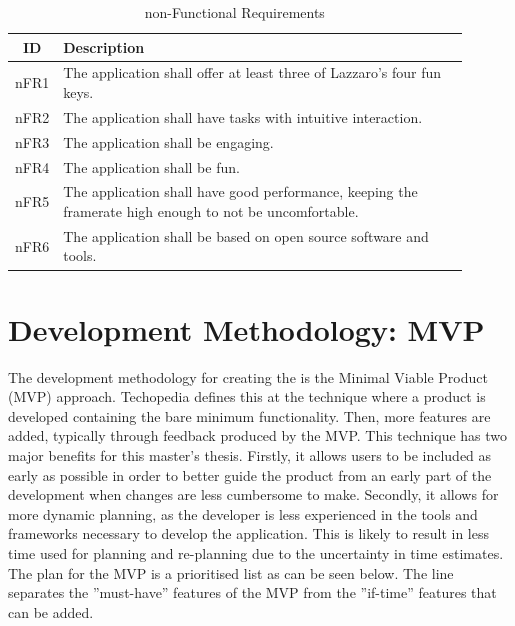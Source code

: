     \FloatBarrier
    \begin{table}
    \label{tab:nfr}
    \caption{non-Functional Requirements}
    \begin{tabular}{ | c | p{0.9\linewidth} | }
        \hline
        \textbf{ID} & \textbf{Description} \\
        \hline
        nFR1 & The application shall offer at least three of Lazzaro's four fun keys. \\
        nFR2 & The application shall have tasks with intuitive interaction. \\
        nFR3 & The application shall be engaging. \\
        nFR4 & The application shall be fun. \\
        nFR5 & The application shall have good performance, keeping the framerate high enough to not be uncomfortable. \\
        nFR6 & The application shall be based on open source software and tools. \\
        \hline
    \end{tabular}
    \end{table}
    \FloatBarrier

\section{Development Methodology: MVP}
    The development methodology for creating the \ApplicationName \hspace{0.1cm} is the Minimal Viable Product (MVP) approach. Techopedia\cite{techopedia} defines this at the technique where a product is developed containing the bare minimum functionality. Then, more features are added, typically through feedback produced by the MVP. This technique has two major benefits for this master's thesis. Firstly, it allows users to be included as early as possible in order to better guide the product from an early part of the development when changes are less cumbersome to make. Secondly, it allows for more dynamic planning, as the developer is less experienced in the tools and frameworks necessary to develop the application. This is likely to result in less time used for planning and re-planning due to the uncertainty in time estimates. The plan for the MVP is a prioritised list as can be seen below. The line separates the ''must-have'' features of the MVP from the ''if-time'' features that can be added.
    
